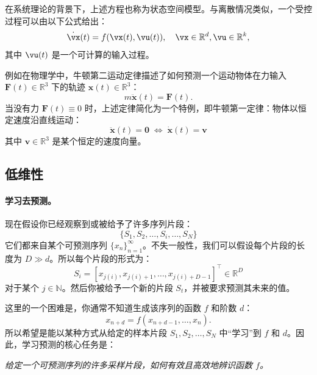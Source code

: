\documentclass[../../book-main.tex]{subfiles}
\begin{document}
在系统理论的背景下\cite{Cal:Des,Sastry-Nonlinear}，上述方程也称为状态空间模型。与离散情况类似，一个受控过程可以由以下公式给出：
\begin{equation}
    \dot{\vx}(t) = f(\vx(t), \vu(t) ), \quad \vx \in \mathbb{R}^d, \vu \in \mathbb{R}^k,
    \label{eqn:process-controlled}
\end{equation}
其中 $\vu(t)$ 是一个可计算的输入过程。

\begin{example}
    例如在物理学中，牛顿第二运动定律描述了如何预测一个运动物体在力输入 $\boldsymbol{F}(t) \in \mathbb{R}^3$ 下的轨迹 $\boldsymbol{x}(t) \in \mathbb{R}^3$：
\begin{equation}
    m\ddot{\boldsymbol{x}}(t) = \boldsymbol{F}(t).
\end{equation}
当没有力 $\boldsymbol{F}(t) \equiv 0$ 时，上述定律简化为一个特例，即牛顿第一定律：物体以恒定速度沿直线运动：
\begin{equation}
   \ddot{\boldsymbol{x}}(t) = \boldsymbol{0} \; \Leftrightarrow \; \dot{\boldsymbol{x}}(t) = \boldsymbol{v}
\end{equation}
其中 $\boldsymbol{v} \in \mathbb{R}^3$ 是某个恒定的速度向量。
\end{example}




\subsection{低维性}\label{sec:intro-low-dimensionality}
\paragraph{学习去预测。}
现在假设你已经观察到或被给予了许多序列片段：
\begin{equation}
    \{S_1, S_2, \ldots, S_i, \ldots, S_N\}
\end{equation}
它们都来自某个可预测序列 $\{x_n\}_{n=1}^\infty$。不失一般性，我们可以假设每个片段的长度为 $D \gg d$。所以每个片段的形式为：
\begin{equation}
    S_i = [x_{j(i)}, x_{j(i)+1}, \ldots, x_{j(i)+D-1}]^\top \in \mathbb{R}^D
\end{equation}
对于某个 $j \in \mathbb{N}$。然后你被给予一个新的片段 $S_t$，并被要求预测其未来的值。

这里的一个困难是，你通常不知道生成该序列的函数 $f$ 和阶数 $d$：
\begin{equation}
    x_{n+d} = f(x_{n+d-1}, \ldots,  x_{n}).
\label{eqn:sequence-order-d}
\end{equation}
所以希望是能以某种方式从给定的样本片段 $S_1, S_2, \ldots, S_N$ 中“学习”到 $f$ 和 $d$。因此，学习预测的核心任务是：
\begin{center}
{\em 给定一个可预测序列的许多采样片段，如何有效且高效地辨识函数 $f$。}
\end{center}
\end{document}

